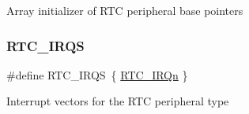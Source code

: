Array initializer of R\+TC peripheral base pointers \mbox{\label{group___r_t_c___peripheral___access___layer_gaa24243a5e7ef8be5eeeedde3eaaa366e}} 
\subsubsection{\texorpdfstring{RTC\_IRQS}{RTC\_IRQS}}
{\footnotesize\ttfamily \#define R\+T\+C\+\_\+\+I\+R\+QS~\{ \mbox{\hyperlink{group___interrupt__vector__numbers_gga666eb0caeb12ec0e281415592ae89083adcc0f2770f7f57f75fac3d8bcac0e858}{R\+T\+C\+\_\+\+I\+R\+Qn}} \}}

Interrupt vectors for the R\+TC peripheral type 
